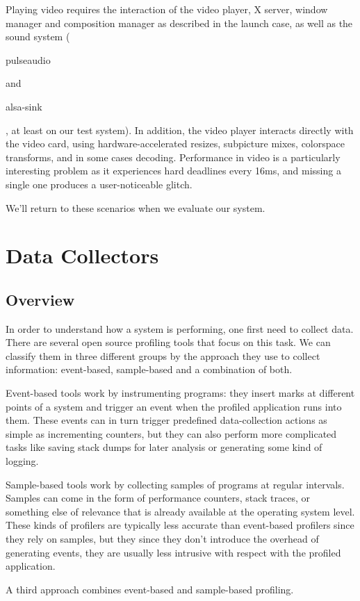 \documentclass[10pt]{article}
\begin{document}
Playing video requires the interaction of the video player, X server, window manager and composition manager as described in the launch case, as well as the sound system (\begin{tt}pulseaudio\end{tt} and \begin{tt}alsa-sink\end{tt}, at least on our test system).  In addition, the video player interacts directly with the video card, using hardware-accelerated resizes, subpicture mixes, colorspace transforms, and in some cases decoding.  Performance in video is a particularly interesting problem as it experiences hard deadlines every 16ms, and missing a single one produces a user-noticeable glitch.

We'll return to these scenarios when we evaluate our system.

\section{Data Collectors}
\subsection{Overview}
In order to understand how a system is performing, one first need to collect data. There are several open source profiling tools that focus on this task. We can classify them in three different groups by the approach they use to collect information: event-based, sample-based and a combination of both. 

Event-based tools work by instrumenting programs: they insert marks at different points of a system and trigger an event when the profiled application runs into them. These events can in turn trigger predefined data-collection actions as simple as incrementing counters, but they can also perform more complicated tasks like saving stack dumps for later analysis or generating some kind of logging.

Sample-based tools work by collecting samples of programs at regular intervals.  Samples can come in the form of performance counters, stack traces, or something else of relevance that is already available at the operating system level. These kinds of profilers are typically less accurate than event-based profilers since they rely on samples, but they since they don't introduce the overhead of generating events, they are usually less intrusive with respect with the profiled application.

A third approach combines event-based and sample-based profiling.
\end{document}

